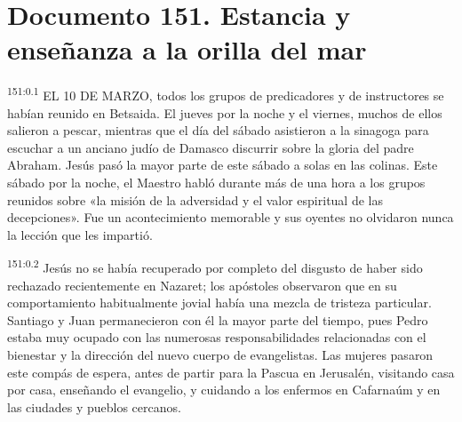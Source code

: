 \chapter{Documento 151. Estancia y enseñanza a la orilla del mar}
\par
\textsuperscript{151:0.1} EL 10 DE MARZO, todos los grupos de predicadores y de instructores se habían reunido en Betsaida. El jueves por la noche y el viernes, muchos de ellos salieron a pescar, mientras que el día del sábado asistieron a la sinagoga para escuchar a un anciano judío de Damasco discurrir sobre la gloria del padre Abraham. Jesús pasó la mayor parte de este sábado a solas en las colinas. Este sábado por la noche, el Maestro habló durante más de una hora a los grupos reunidos sobre «la misión de la adversidad y el valor espiritual de las decepciones». Fue un acontecimiento memorable y sus oyentes no olvidaron nunca la lección que les impartió.

\par
\textsuperscript{151:0.2} Jesús no se había recuperado por completo del disgusto de haber sido rechazado recientemente en Nazaret; los apóstoles observaron que en su comportamiento habitualmente jovial había una mezcla de tristeza particular. Santiago y Juan permanecieron con él la mayor parte del tiempo, pues Pedro estaba muy ocupado con las numerosas responsabilidades relacionadas con el bienestar y la dirección del nuevo cuerpo de evangelistas. Las mujeres pasaron este compás de espera, antes de partir para la Pascua en Jerusalén, visitando casa por casa, enseñando el evangelio, y cuidando a los enfermos en Cafarnaúm y en las ciudades y pueblos cercanos.

